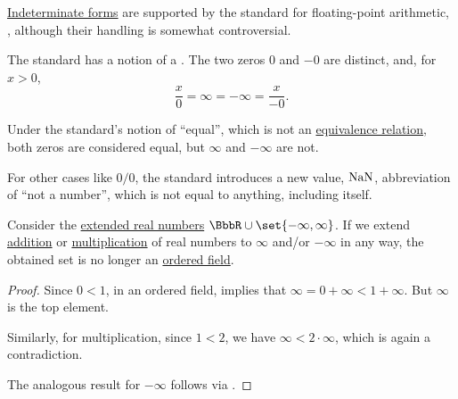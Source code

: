 \begin{remark}\label{rem:floating_point_indeterminate_forms}
  \hyperref[def:indeterminate_form]{Indeterminate forms} are supported by the standard for floating-point arithmetic, \cite[31]{IEEE:754:2019}, although their handling is somewhat controversial.

  The standard has a notion of a . The two zeros \( 0 \) and \( -0 \) are distinct, and, for \( x > 0 \),
  \begin{equation*}
    \frac x 0 = \infty = -\infty = \frac x {-0}.
  \end{equation*}

  Under the standard's notion of \enquote{equal}, which is not an \hyperref[def:equivalence_relation]{equivalence relation}, both zeros are considered equal, but \( \infty \) and \( -\infty \) are not.

  For other cases like \( 0 / 0 \), the standard introduces a new value, \( \op{NaN} \), abbreviation of \enquote{not a number}, which is not equal to anything, including itself.
\end{remark}

\begin{proposition}\label{thm:extended_real_numbers_are_not_ordered_field}
  Consider the \hyperref[def:extended_real_numbers]{extended real numbers} \( \BbbR \cup \set{ -\infty, \infty } \). If we extend \hyperref[def:real_number_arithmetic/addition]{addition} or \hyperref[def:real_number_arithmetic/multiplication]{multiplication} of real numbers to \( \infty \) and/or \( -\infty \) in any way, the obtained set is no longer an \hyperref[def:ordered_semiring]{ordered field}.
\end{proposition}
\begin{proof}
  Since \( 0 < 1 \), in an ordered field,  implies that \( \infty = 0 + \infty < 1 + \infty \). But \( \infty \) is the top element.

  Similarly, for multiplication, since \( 1 < 2 \), we have \( \infty < 2 \cdot \infty \), which is again a contradiction.

  The analogous result for \( -\infty \) follows via .
\end{proof}

